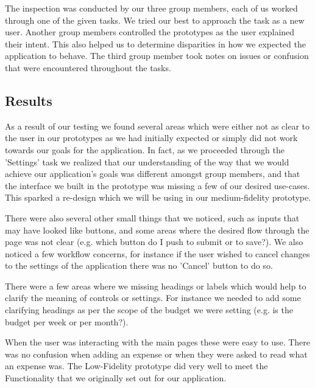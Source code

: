 \documentclass{chi2011}
\begin{document}
    The inspection was conducted by our three group members, each of us worked through one of the given tasks. We
    tried our best to approach the task as a new user. Another group members controlled the prototypes as the user
    explained their intent. This also helped us to determine disparities in how we expected the application to behave.
    The third group member took notes on issues or confusion that were encountered throughout the tasks.

    \subsection{Results} 
    
    As a result of our testing we found several areas which were either not
    as clear to the user in our prototypes as we had initially expected or
    simply did not work towards our goals for the application. In fact, as we
    proceeded through the 'Settings' task we realized that our understanding of
    the way that we would achieve our application's goals was different amongst
    group members, and that the interface we built in the prototype was missing
    a few of our desired use-cases. This sparked a re-design which we will be
    using in our medium-fidelity prototype.

    There were also several other small things that we noticed, such as inputs
    that may have looked like buttons, and some areas where the desired flow
    through the page was not clear (e.g. which button do I push to submit or to
    save?). We also noticed a few workflow concerns, for instance if the user
    wished to cancel changes to the settings of the application there was no
    'Cancel' button to do so.

    There were a few areas where we missing headings or labels which would help
    to clarify the meaning of controls or settings. For instance we needed to
    add some clarifying headings as per the scope of the budget we were setting
    (e.g. is the budget per week or per month?).

	When the user was interacting with the main pages these were easy to use.
	There was no confusion when adding an expense or when they were asked to
	read what an expense was. The Low-Fidelity prototype did very well to meet
	the Functionality that we originally set out for our application. 
\end{document}
